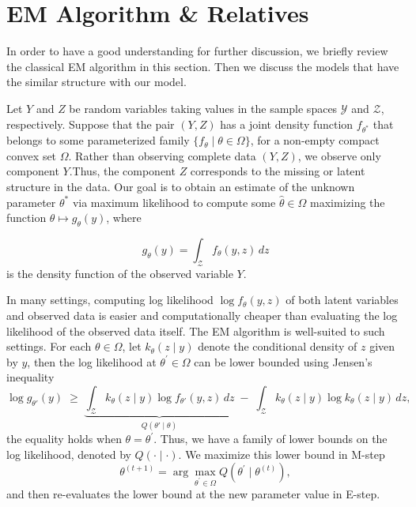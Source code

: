 \section{EM Algorithm \& Relatives}
\label{sec: em-algorithm-relatives}

In order to have a good understanding for further discussion, we briefly review the classical EM algorithm in this section. Then we discuss the models that have the similar structure with our model. 

Let $Y$ and $Z$ be random variables taking values in the sample spaces $\mathcal{Y}$ and $\mathcal{Z}$, respectively. Suppose that the pair $(Y,Z)$ has a joint density function $f_{\theta^{*}}$ that belongs to some parameterized family $\{f_{\theta}\mid \theta\in \Omega
\}$, for a non-empty compact convex set $\Omega$. Rather than observing complete data $(Y,Z)$, we observe only component $Y$.Thus, the component $Z$ corresponds to the missing or latent structure in the data. Our goal is to obtain an estimate of the unknown parameter $\theta^{*}$ via maximum likelihood to compute some $\hat{\theta}\in\Omega$ maximizing the function $\theta\mapsto g_{\theta}(y)$, where

\begin{equation}
    g_{\theta}(y)=\int_{\mathcal{Z}}f_{\theta}(y,z)\,dz
    \label{eq:classical-em-integral}
\end{equation}
is the density function of the observed variable $Y$.

In many settings, computing log likelihood $\log f_{\theta}(y,z)$ of both latent variables and observed data is easier and computationally cheaper than evaluating the log likelihood of the observed data itself. The EM algorithm is well-suited to such settings. For each $\theta\in\Omega$, let $k_{\theta}(z\mid y)$ denote the conditional density of $z$ given by $y$, then the log likelihood at $\theta^{'}\in\Omega$ can be lower bounded using Jensen's inequality
\begin{equation}
    \log g_{\theta'}(y) \;\ge\; \underbrace{\int_{\mathcal{Z}} k_\theta(z \mid y) \log f_{\theta'}(y,z)\, dz}_{Q(\theta' \mid \theta)} \;-\; \int_{\mathcal{Z}} k_\theta(z \mid y) \log k_\theta(z \mid y)\, dz,
    \label{eq:classical-em-jensen}
\end{equation}
the equality holds when $\theta=\theta^{'}$. Thus, we have a family of lower bounds on the log likelihood, denoted by $Q(\cdot\mid \cdot)$. We maximize this lower bound in M-step
\begin{equation}
    \theta^{(t+1)}=\arg\max_{\theta^{'}\in\Omega}Q(\theta^{'}\mid \theta^{(t)}),
    \label{eq:em-m-step}
\end{equation}
and then re-evaluates the lower bound at the new parameter value in E-step.
